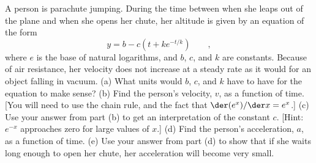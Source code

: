  A person is parachute jumping. During the
time between when she leaps out of the plane and when she
opens her chute, her altitude is given by an equation of the form
\begin{equation*}
      y = b - c\left(t+ke^{-t/k}\right) \qquad ,
\end{equation*}
where $e$ is the base of natural logarithms, and $b$, $c$, and
$k$ are constants. Because of air resistance, her velocity
does not increase at a steady rate as it would for an
object falling in vacuum.\hwendpart
(a) What units would $b$, $c$, and $k$ have to have for the
equation to make sense?\hwendpart
(b) Find the person's velocity, $v$, as a function of time.
[You will need to use the chain rule, and the fact that
$\der(e^x)/\der x=e^x$.] \answercheck\hwendpart
(c) Use your answer from part (b) to get an interpretation
of the constant $c$. [Hint: $e^{-x}$ approaches zero for
large values of $x$.]\hwendpart
(d) Find the person's acceleration, $a$, as a function of time.\answercheck\hwendpart
(e) Use your answer from part (d) to show that if she waits
long enough to open her chute, her acceleration will become very small.
